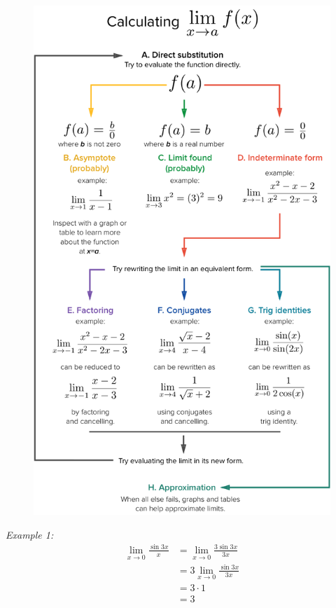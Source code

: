 \documentclass{article}
\begin{document}
            \begin{figure} [hbt!]
                \centering
                \includegraphics[scale=0.5]{Resources/Unit1Limits/limitstrat.png}
            \end{figure}

            \noindent \color{blue} \textit{Example 1:} \color{black} \\

            \begin{align*}
                \lim_{x\to 0}\frac{\sin{3x}}{x} &= \lim_{x\to0}\frac{3\sin{3x}}{3x} \\
                &= 3\lim_{x\to0}\frac{\sin{3x}}{3x} \\
                &= 3\cdot1\\
                &= 3
            \end{align*}
\end{document}
